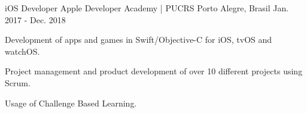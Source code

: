 \begin{cventries}
  \cventry
    {iOS Developer}
    {Apple Developer Academy | PUCRS}
    {Porto Alegre, Brasil}
    {Jan. 2017 - Dec. 2018}
    {
      \begin{cvitems}
        \item {Development of apps and games in Swift/Objective-C for iOS, tvOS and watchOS.}
        \item {Project management and product development of over 10 different projects using Scrum.}
        \item {Usage of Challenge Based Learning.}
      \end{cvitems}
    }
\end{cventries}
